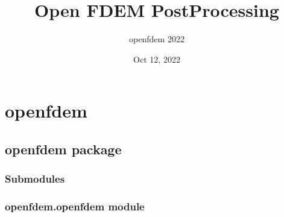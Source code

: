 \documentclass[letterpaper,10pt,english]{sphinxmanual}
\title{Open FDEM Post\sphinxhyphen{}Processing}
\date{Oct 12, 2022}
\author{open\sphinxhyphen{}fdem 2022}
\begin{document}
\pagestyle{empty}
\sphinxmaketitle
\pagestyle{plain}
\sphinxtableofcontents
\pagestyle{normal}
\label{\detokenize{index::doc}}



\chapter{openfdem}
\label{\detokenize{modules:openfdem}}\label{\detokenize{modules::doc}}

\section{openfdem package}
\label{\detokenize{openfdem:openfdem-package}}\label{\detokenize{openfdem::doc}}

\subsection{Submodules}
\label{\detokenize{openfdem:submodules}}

\subsection{openfdem.openfdem module}
\label{\detokenize{openfdem:module-openfdem.openfdem}}\label{\detokenize{openfdem:openfdem-openfdem-module}}
\end{document}
